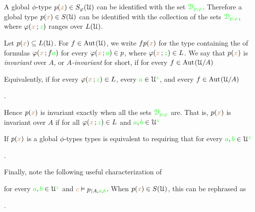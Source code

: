 A global $\phi$-type $p({\color{brown} x})\in S_\varphi(\EuScript U)$ can be identified with the set ${\color{green}\EuScript D_{p,\varphi}}$.
Therefore a global type $p({\color{brown} x})\in S(\EuScript U)$ can be identified with the collection of the sets ${\color{green}\EuScript D_{p,\varphi}}$, where $\varphi({\color{brown} x}\,;{\color{green} z})$ ranges over $L(\EuScript U)$.

Let $p({\color{brown} x})\subseteq L(\EuScript U)$.
For $f\in{\rm Aut\kern.15ex}(\EuScript U)$, we write $fp({\color{brown} x})$ for the type containing the of formulas $\varphi({\color{brown} x}\,;f{\color{green} a})$ for every $\varphi({\color{brown} x}\,;{\color{green} a})\in p$, where $\varphi({\color{brown} x}\,;{\color{green} z})\in L$.
We say that $p({\color{brown} x})$ is \emph{invariant\/} over $A$, or \emph{$A$-invariant\/} for short, if for every $f\in{\rm Aut\kern.15ex}(\EuScript U/A)$


Equivalently, if for every $\varphi({\color{brown} x}\,;{\color{green} z})\in L$, every ${\color{green} a}\in\EuScript U^{\color{green} z}$, and every $f\in{\rm Aut\kern.15ex}(\EuScript U/A)$

.

Hence $p({\color{brown} x})$ is invariant exactly when all the sets $\color{green}\EuScript D_{p,\varphi}$ are.
That is, $p({\color{brown} x})$ is invariant over $A$ if for all $\varphi({\color{brown} x}\,;{\color{green} z})\in L$ and ${\color{green} a},{\color{green} b}\in\EuScript U^{\color{green} z}$



If $p({\color{brown} x})$ is a global $\phi$-types types  is equivalent to requiring that for every ${\color{green} a},{\color{green} b}\in\EuScript U^{\color{green} z}$

.

Finally, note the following useful characterization of 


for every ${\color{green} a},{\color{green} b}\in\EuScript U^{\color{green} z}$ and ${\color{brown} c}\vDash p_{\restriction A,{\color{green} a},{\color{green} b}}$.
When $p({\color{brown} x})\in S(\EuScript U)$, this can be rephrased as

.

